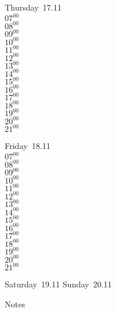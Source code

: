 \documentclass[11pt,a4paper]{book}\usepackage[]{graphicx}\usepackage[]{color}
\begin{document}
\clearpage
\begin{headerbox}
\end{headerbox}
\begin{weekdaybox}
  Thursday~17.11\\
  { 
  \vfill
  $07^{00}$\\
$08^{00}$\\
$09^{00}$\\
$10^{00}$\\
$11^{00}$\\
$12^{00}$\\
$13^{00}$\\
$14^{00}$\\
$15^{00}$\\
$16^{00}$\\
$17^{00}$\\
$18^{00}$\\
$19^{00}$\\
$20^{00}$\\
$21^{00}$\\
  }
\end{weekdaybox} 
\begin{weekdaybox}
  Friday~18.11\\
  { 
  \vfill
  $07^{00}$\\
$08^{00}$\\
$09^{00}$\\
$10^{00}$\\
$11^{00}$\\
$12^{00}$\\
$13^{00}$\\
$14^{00}$\\
$15^{00}$\\
$16^{00}$\\
$17^{00}$\\
$18^{00}$\\
$19^{00}$\\
$20^{00}$\\
$21^{00}$\\
  }
\end{weekdaybox}
\begin{weekendbox}
  Saturday~19.11
  \tcblower
  Sunday~20.11
\end{weekendbox} %
\begin{notebox}
  Notes
\end{notebox}
\clearpage
\end{document}
